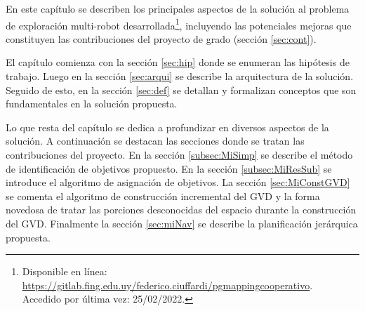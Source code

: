 En este capítulo se describen los principales aspectos de la solución al
problema de exploración multi-robot desarrollada\footnote{Disponible en
línea:\\
\url{https://gitlab.fing.edu.uy/federico.ciuffardi/pgmappingcooperativo}.\\ Accedido por última vez: 25/02/2022.},
incluyendo las potenciales mejoras que constituyen las contribuciones del
proyecto de grado (sección \ref{sec:cont}).

El capítulo comienza con la sección \ref{sec:hip} donde se enumeran las
hipótesis de trabajo. Luego en la sección \ref{sec:arqui} se describe la
arquitectura de la solución. Seguido de esto, en la sección \ref{sec:def} se
detallan y formalizan conceptos que son fundamentales en la solución propuesta.

Lo que resta del capítulo se dedica a profundizar en diversos aspectos de la
solución. A continuación se destacan las secciones donde se tratan las
contribuciones del proyecto. En la sección \ref{subsec:MiSimp} se describe el
método de identificación de objetivos propuesto. En la sección
\ref{subsec:MiResSub} se introduce el algoritmo de asignación de objetivos. La sección
\ref{sec:MiConstGVD} se comenta el algoritmo de
construcción incremental del GVD y la forma novedosa de tratar
las porciones desconocidas del espacio durante la construcción del GVD.
Finalmente la sección \ref{sec:miNav} se describe la planificación jerárquica
propuesta.




